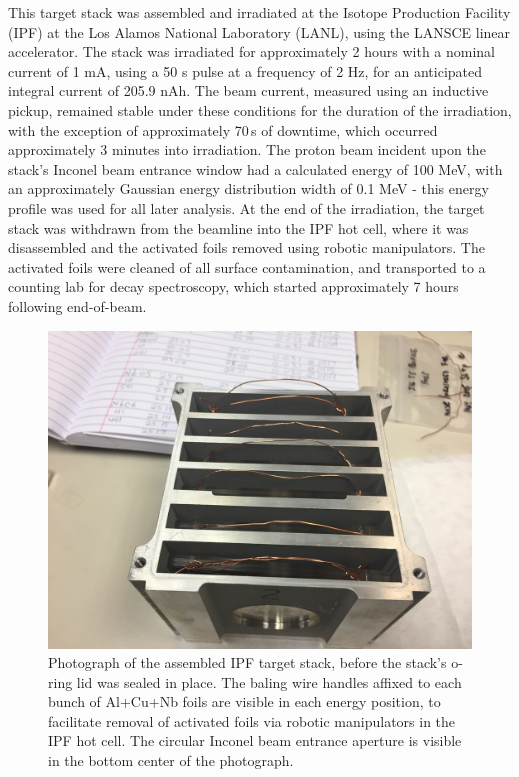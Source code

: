 \documentclass[3p]{elsarticle}
\begin{document}
This target stack was assembled and irradiated at the Isotope Production Facility (IPF) at the Los Alamos National Laboratory (LANL), using the LANSCE linear accelerator. 
The stack was irradiated for approximately 2 hours with a nominal current of 1 mA, using a 50 \micro s pulse at a frequency of 2 Hz, for an anticipated integral current of 205.9 nAh.
The beam current, measured using an inductive pickup, remained stable under these conditions for the duration of the irradiation, with the exception of approximately 70\,s of downtime, which occurred approximately 3 minutes into irradiation.
The proton beam incident upon the stack's Inconel beam entrance window had a calculated energy of 100 MeV, with an approximately Gaussian energy distribution width of 0.1 MeV - this energy profile was used for all later analysis.
At the end of the irradiation, the target stack was withdrawn from the beamline into the IPF hot cell, where it was disassembled and the activated foils removed using robotic manipulators.
The activated foils were cleaned of all surface contamination, and transported to a counting lab for decay spectroscopy, which started approximately 7 hours following end-of-beam.





\begin{figure}
 \centering
 \includegraphics[scale=0.1,clip=true,trim=13cm 0cm 3cm 6cm]{./figures/IMG_1975.JPG}
 \caption{Photograph of the assembled IPF target stack, before the stack's o-ring lid was sealed in place. The baling wire handles affixed to each bunch of Al+Cu+Nb foils are visible in each energy position, to facilitate removal of activated foils via robotic manipulators in the IPF hot cell. The circular Inconel beam entrance aperture is visible in the bottom center of the photograph.  }
 \label{fig:target_stack}
\end{figure}
\end{document}
